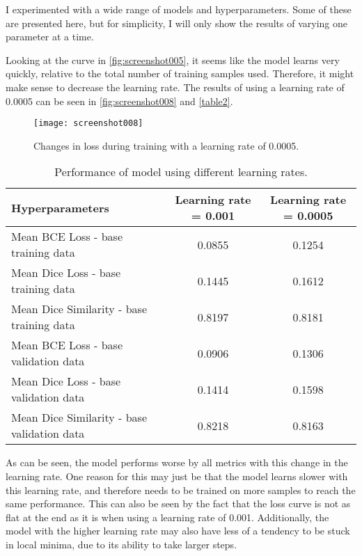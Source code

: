 \documentclass[a4paper, 12pt]{article}
\begin{document}
I experimented with a wide range of models and hyperparameters. Some of these are presented here, but for simplicity, I will only show the results of varying one parameter at a time.

Looking at the curve in \autoref{fig:screenshot005}, it seems like the model learns very quickly, relative to the total number of training samples used. Therefore, it might make sense to decrease the learning rate. The results of using a learning rate of 0.0005 can be seen in \autoref{fig:screenshot008} and \autoref{table2}.

\begin{figure}[H]
	\centering
	\texttt{[image: screenshot008]}
	\caption{Changes in loss during training with a learning rate of 0.0005.}
	\label{fig:screenshot008}
\end{figure}

\begin{table}[H]
	\centering
	\begin{tabular}{|l||c|c|}
		\hline
		Hyperparameters & Learning rate = 0.001 & Learning rate = 0.0005\\
		\hline\hline
		Mean BCE Loss - base training data & 0.0855 & 0.1254\\
		\hline
		Mean Dice Loss - base training data & 0.1445 & 0.1612\\
		\hline
		Mean Dice Similarity - base training data & 0.8197 & 0.8181\\
		\hline\hline
		Mean BCE Loss - base validation data & 0.0906 & 0.1306\\
		\hline
		Mean Dice Loss - base validation data & 0.1414 & 0.1598\\
		\hline
		Mean Dice Similarity - base validation data & 0.8218 & 0.8163\\
		\hline
	\end{tabular}
	\caption{Performance of model using different learning rates.}
	\label{table2}
\end{table}

As can be seen, the model performs worse by all metrics with this change in the learning rate. One reason for this may just be that the model learns slower with this learning rate, and therefore needs to be trained on more samples to reach the same performance. This can also be seen by the fact that the loss curve is not as flat at the end as it is when using a learning rate of 0.001. Additionally, the model with the higher learning rate may also have less of a tendency to be stuck in local minima, due to its ability to take larger steps.
\end{document}
